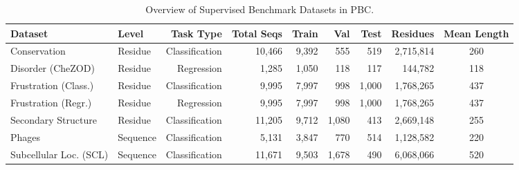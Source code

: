 \begin{table}[t]
\centering
\small
\caption{Overview of Supervised Benchmark Datasets in PBC.}
\label{tab:pbc_supervised_datasets}
\begin{tabular}{llrrrrrrc}
\toprule
\textbf{Dataset} & \textbf{Level} & \textbf{Task Type} & \textbf{Total Seqs} & \textbf{Train} & \textbf{Val} & \textbf{Test} & \textbf{Residues} & \textbf{Mean Length} \\
\midrule
Conservation & Residue & Classification & 10,466 & 9,392 & 555 & 519 & 2,715,814 & 260 \\
Disorder (CheZOD) & Residue & Regression & 1,285 & 1,050 & 118 & 117 & 144,782 & 118 \\
Frustration (Class.) & Residue & Classification & 9,995 & 7,997 & 998 & 1,000 & 1,768,265 & 437 \\
Frustration (Regr.) & Residue & Regression & 9,995 & 7,997 & 998 & 1,000 & 1,768,265 & 437 \\
Secondary Structure & Residue & Classification & 11,205 & 9,712 & 1,080 & 413 & 2,669,148 & 255 \\
Phages & Sequence & Classification & 5,131 & 3,847 & 770 & 514 & 1,128,582 & 220 \\
Subcellular Loc. (SCL) & Sequence & Classification & 11,671 & 9,503 & 1,678 & 490 & 6,068,066 & 520 \\
\bottomrule
\end{tabular}
\end{table}